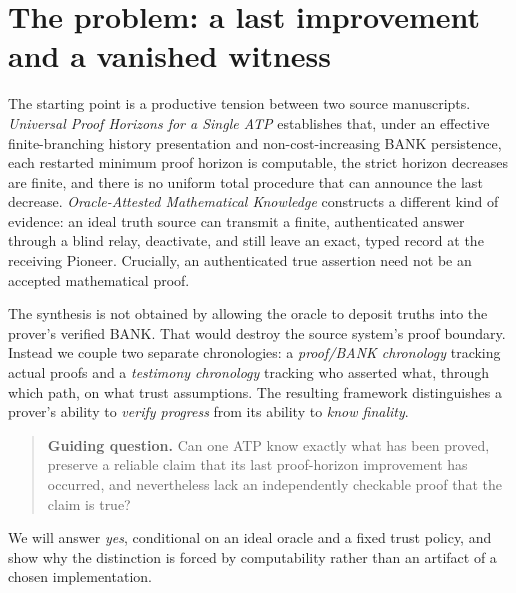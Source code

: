 \documentclass[11pt,letterpaper]{article}
\theoremstyle{definition}
\theoremstyle{remark}
\begin{document}
\section{The problem: a last improvement and a vanished witness}
The starting point is a productive tension between two source manuscripts. \emph{Universal Proof Horizons for a Single ATP} establishes that, under an effective finite-branching history presentation and non-cost-increasing BANK persistence, each restarted minimum proof horizon is computable, the strict horizon decreases are finite, and there is no uniform total procedure that can announce the last decrease. \emph{Oracle-Attested Mathematical Knowledge} constructs a different kind of evidence: an ideal truth source can transmit a finite, authenticated answer through a blind relay, deactivate, and still leave an exact, typed record at the receiving Pioneer. Crucially, an authenticated true assertion need not be an accepted mathematical proof.

The synthesis is not obtained by allowing the oracle to deposit truths into the prover's verified BANK. That would destroy the source system's proof boundary. Instead we couple two separate chronologies: a \emph{proof/BANK chronology} tracking actual proofs and a \emph{testimony chronology} tracking who asserted what, through which path, on what trust assumptions. The resulting framework distinguishes a prover's ability to \emph{verify progress} from its ability to \emph{know finality}.

\begin{quote}
\textbf{Guiding question.} Can one ATP know exactly what has been proved, preserve a reliable claim that its last proof-horizon improvement has occurred, and nevertheless lack an independently checkable proof that the claim is true?
\end{quote}
We will answer \emph{yes}, conditional on an ideal oracle and a fixed trust policy, and show why the distinction is forced by computability rather than an artifact of a chosen implementation.
\end{document}

